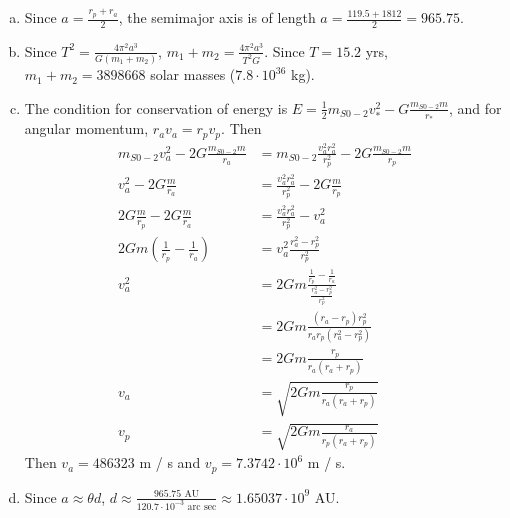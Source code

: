 \documentclass{esg8012pset}
\begin{document}
\begin{solution}
\begin{enumerate}[(a)]
  \item Since $a = \frac{r_p + r_a}{2}$, the semimajor axis is of length $a = \frac{119.5 + 1812}{2} = 965.75$.
  \item Since $T^2 = \frac{4\pi^2 a^3}{G(m_1 + m_2)}$, $m_1 + m_2 = \frac{4\pi^2 a^3}{T^2 G}$.  Since $T = 15.2$ yrs, $m_1 + m_2 = 3898668$ solar masses ($7.8 \cdot 10^{36}$ kg).
  \item The condition for conservation of energy is $E = \frac12 m_{S0-2} v_*^2 - G\frac{m_{S0-2} m}{r_*}$, and for angular momentum, $r_a v_a = r_p v_p$.  Then \begin{align*}
 m_{S0-2} v_a^2 - 2G\frac{m_{S0-2} m}{r_a} & = m_{S0-2} \frac{v_a^2 r_a^2}{r_p^2} - 2G\frac{m_{S0-2} m}{r_p} \\
 v_a^2 - 2G\frac{m}{r_a} & = \frac{v_a^2 r_a^2}{r_p^2} - 2G\frac{m}{r_p} \\
 2G\frac{m}{r_p} - 2G\frac{m}{r_a} & = \frac{v_a^2 r_a^2}{r_p^2} - v_a^2 \\
 2G m \left(\frac{1}{r_p} - \frac{1}{r_a}\right) & = v_a^2\frac{r_a^2 - r_p^2}{r_p^2} \\
 v_a^2 & = 2G m \frac{\frac{1}{r_p} - \frac{1}{r_a}}{\frac{r_a^2 - r_p^2}{r_p^2}} \\
  & = 2G m \frac{(r_a - r_p) r_p^2}{r_a r_p(r_a^2 - r_p^2)} \\
  & = 2G m \frac{r_p}{r_a (r_a + r_p)} \\
 v_a & = \sqrt{2G m \frac{r_p}{r_a (r_a + r_p)}} \\
 v_p & = \sqrt{2G m \frac{r_a}{r_p (r_a + r_p)}}
\end{align*}
  Then $v_a = 486323$ m / s and $v_p = 7.3742\cdot 10^6$ m / s.
  \item Since $a \approx \theta d$, $d \approx \frac{965.75\text{ AU}}{120.7\cdot 10^{-3}\text{ arc sec}}\approx 1.65037\cdot 10^9$ AU.
\end{enumerate}
\end{solution}
\end{document}
